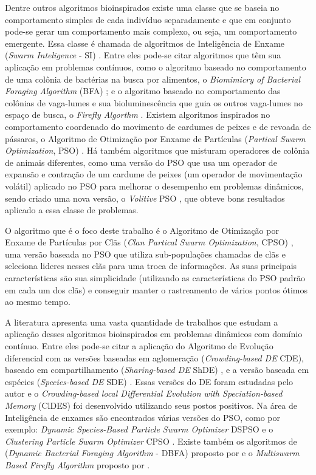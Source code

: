 Dentre outros algoritmos bioinspirados existe uma classe que se baseia no comportamento simples de cada indivíduo separadamente e que em conjunto pode-se gerar um comportamento mais complexo, ou seja, um comportamento emergente. Essa classe é chamada de algoritmos de Inteligência de Enxame (\textit{Swarm Inteligence} - SI) \cite{parpinelli2011new}. Entre eles pode-se citar algoritmos que têm sua aplicação em problemas contínuos, como o algoritmo baseado no comportamento de uma colônia de bactérias na busca por alimentos, o \textit{Biomimicry of Bacterial Foraging Algorithm} (BFA) \cite{passino2002biomimicry}; e o algoritmo baseado no comportamento das colônias de vaga-lumes e sua bioluminescência que guia os outros vaga-lumes no espaço de busca, o \textit{Firefly Algorthm} \cite{firefly}. Existem algoritmos inspirados no comportamento coordenado do movimento de cardumes de peixes e de revoada de pássaros, o Algoritmo de Otimização por Enxame de Partículas (\textit{Partical Swarm Optimization}, PSO) \cite{pso}. Há também algoritmos que misturam operadores de colônia de animais diferentes, como uma versão do PSO que usa um operador de expansão e contração de um cardume de peixes (um operador de movimentação volátil) aplicado no PSO para melhorar o desempenho em problemas dinâmicos, sendo criado uma nova versão, o \textit{Volitive} PSO \cite{cavalcanti2011hybrid}, que obteve bons resultados aplicado a essa classe de problemas.

O algoritmo que é o foco deste trabalho é o Algoritmo de Otimização por Enxame de Partículas por Clãs (\textit{Clan Partical Swarm Optimization}, CPSO) \cite{ferreira2009clan}, uma versão baseada no PSO que utiliza sub-populações chamadas de clãs e seleciona lideres nesses clãs para uma troca de informações. As suas principais características são sua simplicidade (utilizando as características do PSO padrão em cada um dos clãs) e conseguir manter o rastreamento de vários pontos ótimos ao mesmo tempo.

A literatura apresenta uma vasta quantidade de trabalhos que estudam a aplicação desses algoritmos bioinspirados em problemas dinâmicos com domínio contínuo. Entre eles pode-se citar a aplicação do Algoritmo de Evolução diferencial com as versões baseadas em aglomeração (\textit{Crowding-based DE} CDE), baseado em compartilhamento (\textit{Sharing-based DE} ShDE) \cite{thomsen2004multimodal}, e a versão baseada em espécies (\textit{Species-based DE} SDE) \cite{li2005efficient}. Essas versões do DE foram estudadas pelo autor e o \textit{Crowding-based local Differential Evolution with Speciation-based Memory} (ClDES) foi desenvolvido utilizando seus postos positivos. Na área de Inteligência de enxames são encontrados várias versões do PSO, como por exemplo: \textit{Dynamic Species-Based Particle Swarm Optimizer} DSPSO \cite{parrott2006locating} e o \textit{Clustering Particle Swarm Optimizer} CPSO \cite{yang2010clustering}. Existe também os algoritmos de (\textit{Dynamic Bacterial Foraging Algorithm} - DBFA) proposto por \cite{passino2002biomimicry} e o \textit{Multiswarm Based Firefly Algorithm} proposto por \cite{farahani2011multiswarm}.

